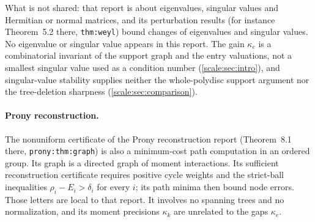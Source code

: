 \documentclass[11pt,a4paper]{article}
\numberwithin{equation}{section}
\theoremstyle{definition}
\begin{document}
What is not shared: that report is about eigenvalues, singular values and
Hermitian or normal matrices, and its perturbation results (for instance
Theorem~5.2 there, \nolinkurl{thm:weyl}) bound changes of eigenvalues and
singular values. No eigenvalue or singular value appears in this report. The
gain $\kappa_e$ is a combinatorial invariant of the support graph and the
entry valuations, not a smallest singular value used as a condition number
(\cref{scale:sec:intro}), and singular-value stability supplies neither the
whole-polydisc support argument nor the tree-deletion sharpness
(\cref{scale:sec:comparison}).

\paragraph{Prony reconstruction.}
The nonuniform certificate of the Prony reconstruction report
(Theorem~8.1 there, \nolinkurl{prony:thm:graph}) is also a minimum-cost path
computation in an ordered group. Its graph is a directed graph of moment
interactions. Its sufficient reconstruction certificate requires positive
cycle weights and the strict-ball inequalities
$\rho_i-E_i>\delta_i$ for every $i$; its path minima then bound node errors.
Those letters are local to that report. It involves no spanning trees and no normalization, and its moment
precisions $\kappa_k$ are unrelated to the gaps $\kappa_e$.
\end{document}
